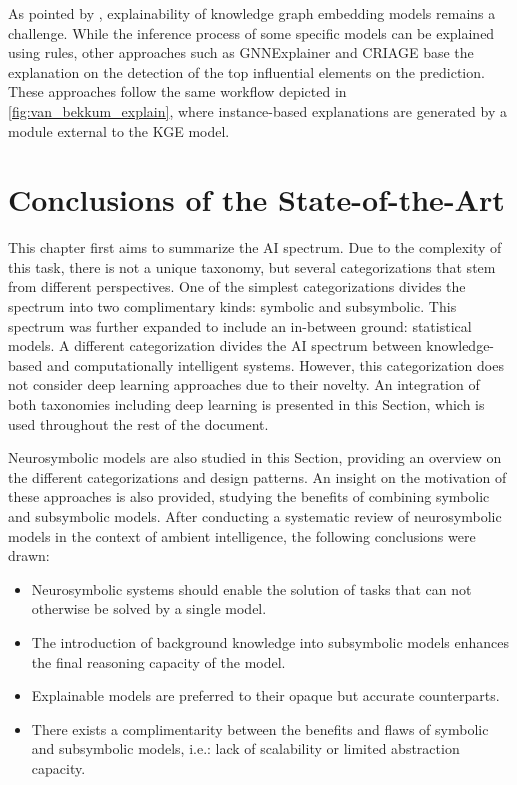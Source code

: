 As pointed by \cite{bianchi_kge_explainability_2020}, explainability of knowledge graph embedding models remains a challenge. While the inference process of some specific models can be explained using rules, other approaches such as GNNExplainer \citep{ying_2019_gnnexplainer} and CRIAGE \citep{pezeshkpour_2019_investigating} base the explanation on the detection of the top influential elements on the prediction. These approaches follow the same workflow depicted in \ref{fig:van_bekkum_explain}, where instance-based explanations are generated by a module external to the KGE model. 

\section{Conclusions of the State-of-the-Art}
This chapter first aims to summarize the AI spectrum. Due to the complexity of this task, there is not a unique taxonomy, but several categorizations that stem from different perspectives. One of the simplest categorizations divides the spectrum into two complimentary kinds: symbolic and subsymbolic. This spectrum was further expanded to include an in-between ground: statistical models. A different categorization divides the AI spectrum between knowledge-based and computationally intelligent systems. However, this categorization does not consider deep learning approaches due to their novelty. An integration of both taxonomies including deep learning is presented in this Section, which is used throughout the rest of the document.

Neurosymbolic models are also studied in this Section, providing an overview on the different categorizations and design patterns. An insight on the motivation of these approaches is also provided, studying the benefits of combining symbolic and subsymbolic models. After conducting a systematic review of neurosymbolic models in the context of ambient intelligence, the following conclusions were drawn:
\begin{itemize}
    \item Neurosymbolic systems should enable the solution of tasks that can not otherwise be solved by a single model.
    \item The introduction of background knowledge into subsymbolic models enhances the final reasoning capacity of the model.
    \item Explainable models are preferred to their opaque but accurate counterparts.
    \item There exists a complimentarity between the benefits and flaws of symbolic and subsymbolic models, i.e.: lack of scalability or limited abstraction capacity.
\end{itemize}

